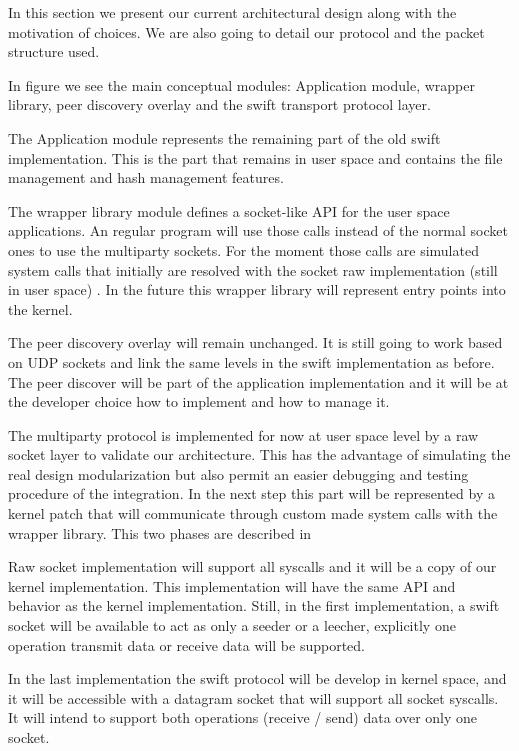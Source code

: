 

In this section we present our current architectural design along with the motivation of choices. We are also going to 
detail our protocol and the packet structure used.

In figure  we see the main conceptual modules: Application module, 
wrapper library, peer discovery overlay and the swift transport protocol layer.


The Application module represents the remaining part of the old swift implementation. This is the part that remains in
user space and contains the file management and hash management features. 

The wrapper library module defines a socket-like API for the user space applications. An regular program will use those
calls instead of the normal socket ones to use the multiparty sockets. For the moment those calls are simulated system
calls that initially are resolved with the socket raw implementation (still in user space) . 
In the future this wrapper library will represent entry points into the kernel.

The peer discovery overlay will remain unchanged. It is still going to work based on UDP sockets and link the same
levels in the swift implementation as before. The peer discover will be part of the application implementation and it
will be at the developer choice how to implement and how to manage it. 

The multiparty protocol is implemented for now at user space level by a raw socket layer to validate our architecture.
This has the advantage of simulating the real design modularization but also permit an easier debugging and testing
procedure of the integration. In the next step this part will be represented by a kernel patch that will communicate
through custom made system calls with the wrapper library. This two phases are described in


Raw socket implementation will support all syscalls and it will be a copy of our kernel implementation. 
This implementation will have the same API and behavior as the kernel implementation. Still, in the first
implementation, a swift socket will be available to act as only a seeder or a leecher, explicitly one operation transmit
data or receive data will be supported.
 
In the last implementation the swift protocol will be develop in kernel space, and it will be accessible with a
datagram socket that will support all socket syscalls. It will intend to support both operations (receive / send) data
over only one socket.



